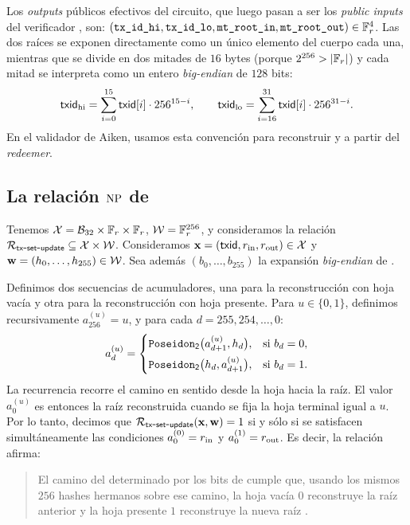 Los \textit{outputs} públicos efectivos del circuito, que luego pasan a ser los \textit{public inputs} del verificador \Groth \Onchain, son: $\left(\texttt{tx\_id\_hi}, \texttt{tx\_id\_lo}, \texttt{mt\_root\_in}, \texttt{mt\_root\_out}\right) \in \mathbb{F}_r^4$. Las dos raíces se exponen directamente como un único elemento del cuerpo cada una, mientras que \TxId se divide en dos mitades de $16$ bytes (porque $2^{256} > |\mathbb{F}_r|$) y cada mitad se interpreta como un entero \textit{big-endian} de $128$ bits:
$$\mathsf{txid}_{\mathrm{hi}} = \sum_{i=0}^{15} \mathsf{txid}[i]\cdot 256^{15-i}, \qquad \mathsf{txid}_{\mathrm{lo}} = \sum_{i=16}^{31} \mathsf{txid}[i]\cdot 256^{31-i}.$$
En el validador de Aiken, usamos esta convención para reconstruir \TxIdHi y \TxIdLo a partir del \textit{redeemer}.

\subsection{La relación \texorpdfstring{\(\mathrm{NP}\)}{NP} de \TxSetUpdateCircuit}
\label{subsec:tx-set-update-la-relacion-np-de-txsetupdatecircuit}

Tenemos $\mathcal{X} = \mathcal{B}_{32} \times \mathbb{F}_r \times \mathbb{F}_r$, $\mathcal{W} = \mathbb{F}_r^{256}$, y consideramos la relación
$\mathcal{R}_{\mathsf{tx\mbox{-}set\mbox{-}update}} \subseteq \mathcal{X} \times \mathcal{W}$. Consideramos $\mathbf{x} = (\mathsf{txid}, r_{\mathrm{in}}, r_{\mathrm{out}}) \in \mathcal{X}$ y $\mathbf{w} = (h_0,\ldots,h_{255}) \in \mathcal{W}$. Sea además $(b_0,\ldots,b_{255})$ la expansión \textit{big-endian} de \TxId.

Definimos dos secuencias de acumuladores, una para la reconstrucción con hoja vacía y otra para la reconstrucción con hoja presente. Para $u \in \{0,1\}$, definimos recursivamente $a_{256}^{(u)} = u$, y para cada $d = 255,254,\ldots,0$:
$$a_d^{(u)} =
	\begin{cases}
 		\texttt{Poseidon}_{\mathsf{2}}\bigl(a_{d+1}^{(u)}, h_d\bigr), & \text{si } b_d = 0,\\[4pt]
 		\texttt{Poseidon}_{\mathsf{2}}\bigl(h_d, a_{d+1}^{(u)}\bigr), & \text{si } b_d = 1.
	\end{cases}$$
La recurrencia recorre el camino en sentido desde la hoja hacia la raíz. El valor $a_0^{(u)}$ es entonces la raíz reconstruida cuando se fija la hoja terminal igual a $u$. Por lo tanto, decimos que $\mathcal{R}_{\mathsf{tx\mbox{-}set\mbox{-}update}}(\mathbf{x}, \mathbf{w}) = 1$ si y sólo si se satisfacen simultáneamente las condiciones $a_0^{(0)} = r_{\mathrm{in}}$ y $a_0^{(1)} = r_{\mathrm{out}}$. Es decir, la relación \TxSetUpdateRelation afirma:

\begin{quote}
El camino del \SMT determinado por los bits de \TxId cumple que, usando los mismos $256$ hashes hermanos sobre ese camino, la hoja vacía $0$ reconstruye la raíz anterior \RootIn y la hoja presente $1$ reconstruye la nueva raíz \RootOut.
\end{quote}


